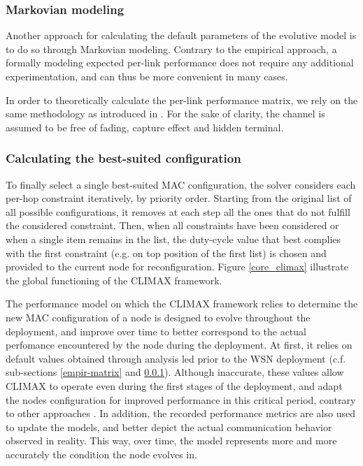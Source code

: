 \documentclass[12pt,journal,compsoc]{IEEEtran}
\begin{document}
\subsubsection{Markovian modeling}
\label{markov-matrix}
Another approach for calculating the default parameters of the evolutive model is to do so through Markovian modeling. Contrary to the empirical approach, a formally modeling expected per-link performance does not require any additional experimentation, and can thus be more convenient in many cases.

In order to theoretically calculate the per-link performance matrix, we rely on the same methodology as introduced in \cite{yang11}. For the sake of clarity, the channel is assumed to be free of fading, capture effect and hidden terminal. 

\subsubsection{Calculating the best-suited configuration}

To finally select a single best-suited MAC configuration, the solver considers each per-hop constraint iteratively, by priority order. Starting from the original list of all possible configurations, it removes at each step all the ones that do not fulfill the considered constraint. Then, when all constraints have been considered or when a single item remains in the list, the duty-cycle value that best complies with the first constraint (e.g. on top position of the first list) is chosen and provided to the current node for reconfiguration. Figure \ref{core_climax} illustrate the global functioning of the CLIMAX framework.%

The performance model on which the CLIMAX framework relies to determine the new MAC configuration of a node is designed to evolve throughout the deployment, and improve over time to better correspond to the actual perfomance encountered by the node during the deployment. At first, it relies on default values obtained through analysis led prior to the WSN deployment (c.f. sub-sections \ref{empir-matrix} and \ref{markov-matrix}). Although inaccurate, these values allow CLIMAX to operate even during the first stages of the deployment, and adapt the nodes configuration for improved performance in this critical period, contrary to other approaches \cite{zfm12ptunes, ecc12cross, mh10duty}. In addition, the recorded performance metrics are also used to update the models, and better depict the actual communication behavior observed in reality. This way, over time, the model represents more and more accurately the condition the node  evolves in.
\end{document}
